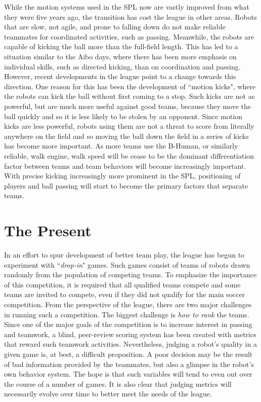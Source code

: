\documentclass{llncs}
\begin{document}
While the motion systems used in the SPL now are vastly improved from what they were
five years ago, the transition has cost the league in other areas. Robots that
are slow, not agile, and prone to falling down do not make reliable teammates 
for coordinated activities, such as passing. Meanwhile, the robots are
capable of kicking the ball more than the full-field length. This has led
to a situation similar to the Aibo days, where there has been more emphasis
on individual skills, such as directed kicking, than on coordination and passing.
However, recent developments in the league point to a change towards this
direction. One reason for this has been the development of ``motion
kicks", where the robots can kick the ball without first coming to a stop.
Such kicks are not as powerful, but are much more useful against good teams, because they
move the ball quickly and so it is less likely to be stolen
by an opponent. Since motion kicks are less powerful, robots using them are not
a threat to score from literally anywhere on the field and so moving the
ball down the field in a series of kicks has become more important.
As more teams use the B-Human, or similarly reliable,
walk engine, walk speed will be cease to be the dominant differentiation factor
between teams and team behaviors will become increasingly important. With
precise kicking increasingly more prominent in the SPL, positioning of players and ball passing will
start to become the primary factors that separate teams.

\section{The Present}

In an effort to spur development of better team play, the league has
begun to experiment with ``\textit{drop-in}" games. Such games consist of
teams of robots drawn randomly from the population of competing
teams. To emphasize the
importance of this competition, it is required that all qualified teams compete and some teams
are invited to compete, even if they did not qualify for the main soccer
competition. From the perspective of the league, there are two major challenges
in running such a competition. The biggest challenge is \textit{how to rank}
the teams. Since one of the major goals of the competition is to increase interest in
passing and teamwork, a blind, peer-review scoring system has been created with metrics
that reward such teamwork activities. Nevertheless, judging a robot's quality in
a given game is, at best, a difficult proposition. A poor decision may be
the result of bad information provided by the teammates, but also a glimpse in the robot's
own behavior system. The hope is that such variables will tend to even
out over the course of a number of games. It is also clear that judging
metrics will necessarily evolve over time to better meet the needs of the
league.
\end{document}
